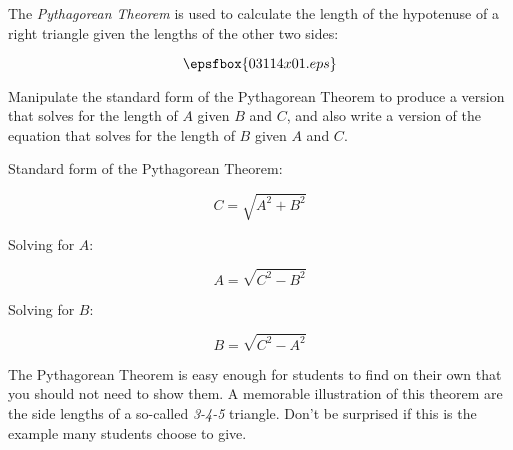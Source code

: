 

The {\it Pythagorean Theorem} is used to calculate the length of the hypotenuse of a right triangle given the lengths of the other two sides:

$$\epsfbox{03114x01.eps}$$

Manipulate the standard form of the Pythagorean Theorem to produce a version that solves for the length of $A$ given $B$ and $C$, and also write a version of the equation that solves for the length of $B$ given $A$ and $C$.







Standard form of the Pythagorean Theorem:

$$C = \sqrt{A^2 + B^2}$$

\vskip 10pt

Solving for $A$:

$$A = \sqrt{C^2 - B^2}$$

\vskip 10pt

Solving for $B$:

$$B = \sqrt{C^2 - A^2}$$







The Pythagorean Theorem is easy enough for students to find on their own that you should not need to show them.  A memorable illustration of this theorem are the side lengths of a so-called {\it 3-4-5} triangle.  Don't be surprised if this is the example many students choose to give.




